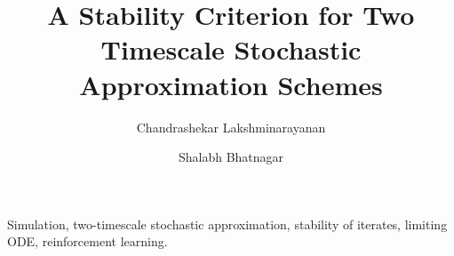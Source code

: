 \documentclass[preprint]{elsarticle}    %
\begin{document}
\begin{frontmatter}

\title{A Stability Criterion for Two Timescale Stochastic Approximation Schemes}
\author{Chandrashekar Lakshminarayanan}
\author{Shalabh Bhatnagar}
\address{Department of Computer Science and Automation,\\ Indian Institute of Science,\\ Bangalore-560012,\\ India.}  %

\begin{keyword}
Simulation, two-timescale stochastic approximation, stability of iterates, limiting ODE, 
reinforcement learning.
\end{keyword}
\end{frontmatter}







\end{document}
